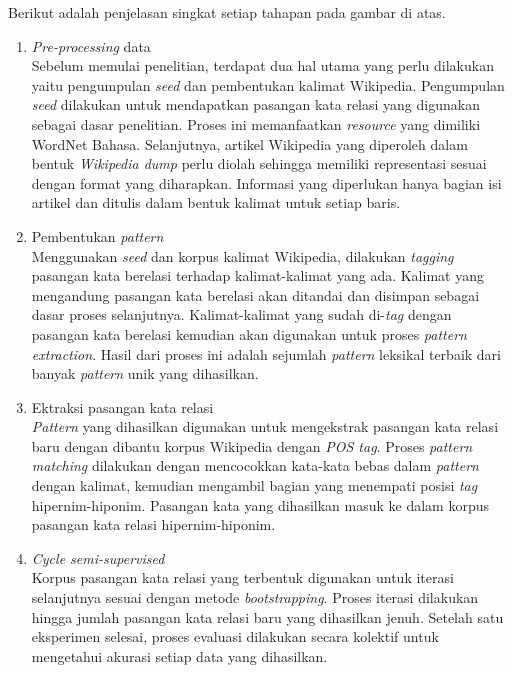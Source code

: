 \noindent Berikut adalah penjelasan singkat setiap tahapan pada gambar di atas.
\begin{enumerate}
  \item \textit{Pre-processing} data \\
  Sebelum memulai penelitian, terdapat dua hal utama yang perlu dilakukan yaitu pengumpulan \textit{seed} dan pembentukan kalimat Wikipedia. Pengumpulan \textit{seed} dilakukan untuk mendapatkan pasangan kata relasi yang digunakan sebagai dasar penelitian. Proses ini memanfaatkan \textit{resource} yang dimiliki WordNet Bahasa. Selanjutnya, artikel Wikipedia yang diperoleh dalam bentuk \textit{Wikipedia dump} perlu diolah sehingga memiliki representasi sesuai dengan format yang diharapkan. Informasi yang diperlukan hanya bagian isi artikel dan ditulis dalam bentuk kalimat untuk setiap baris.
  \item Pembentukan \textit{pattern} \\
  Menggunakan \textit{seed} dan korpus kalimat Wikipedia, dilakukan \textit{tagging} pasangan kata berelasi terhadap kalimat-kalimat yang ada. Kalimat yang mengandung pasangan kata berelasi akan ditandai dan disimpan sebagai dasar proses selanjutnya. Kalimat-kalimat yang sudah di-\textit{tag} dengan pasangan kata berelasi kemudian akan digunakan untuk proses \textit{pattern extraction}. Hasil dari proses ini adalah sejumlah \textit{pattern} leksikal terbaik dari banyak \textit{pattern} unik yang dihasilkan.
  \item Ektraksi pasangan kata relasi \\
  \textit{Pattern} yang dihasilkan digunakan untuk mengekstrak pasangan kata relasi baru dengan dibantu korpus Wikipedia dengan \textit{POS tag}. Proses \textit{pattern matching} dilakukan dengan mencocokkan kata-kata bebas dalam \textit{pattern} dengan kalimat, kemudian mengambil bagian yang menempati posisi \textit{tag} hipernim-hiponim. Pasangan kata yang dihasilkan masuk ke dalam korpus pasangan kata relasi hipernim-hiponim.
  \item \textit{Cycle semi-supervised} \\ 
  Korpus pasangan kata relasi yang terbentuk digunakan untuk iterasi selanjutnya sesuai dengan metode \textit{bootstrapping}. Proses iterasi dilakukan hingga jumlah pasangan kata relasi baru yang dihasilkan jenuh. Setelah satu eksperimen selesai, proses evaluasi dilakukan secara kolektif untuk mengetahui akurasi setiap data yang dihasilkan.
\end{enumerate}

